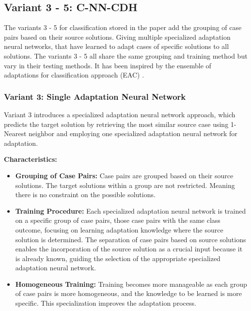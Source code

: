 \documentclass[a4paper, 12pt]{report}
\begin{document}
\subsection{Variant 3 - 5: C-NN-CDH}
The variants 3 - 5 for classification stored in the paper \cite{ye2021learning} add the grouping of case pairs based on their source solutions. Giving multiple specialized adaptation neural networks,
that have learned to adapt cases of specific solutions to all solutions. The variants 3 - 5 all share the same grouping and training method but vary in their testing methods.
It has been inspired by the ensemble of adaptations for classification approach (EAC) \cite{jalali2017learning}.

\subsubsection{Variant 3: Single Adaptation Neural Network}

Variant 3 introduces a specialized adaptation neural network approach,
which predicts the target solution by retrieving the most similar source case using 1-Nearest neighbor and employing one specialized adaptation neural network for adaptation.


\textbf{Characteristics:}

\begin{itemize}
    \item \textbf{Grouping of Case Pairs:} Case pairs are grouped based on their source solutions. 
    The target solutions within a group are not restricted. 
    Meaning there is no constraint on the possible solutions. 
    
    \item \textbf{Training Procedure:} Each specialized adaptation neural network is trained on a specific group of case pairs, those case pairs with the same class outcome, 
    focusing on learning adaptation knowledge where the source solution is determined. 
    The separation of case pairs based on source solutions enables the incorporation of the source solution as a crucial input because it is already known, guiding the selection of the appropriate specialized adaptation neural network.
    
    \item \textbf{Homogeneous Training:} Training becomes more manageable as each group of case pairs is more homogeneous, 
    and the knowledge to be learned is more specific. This specialization improves the adaptation process.
\end{itemize}
\end{document}
